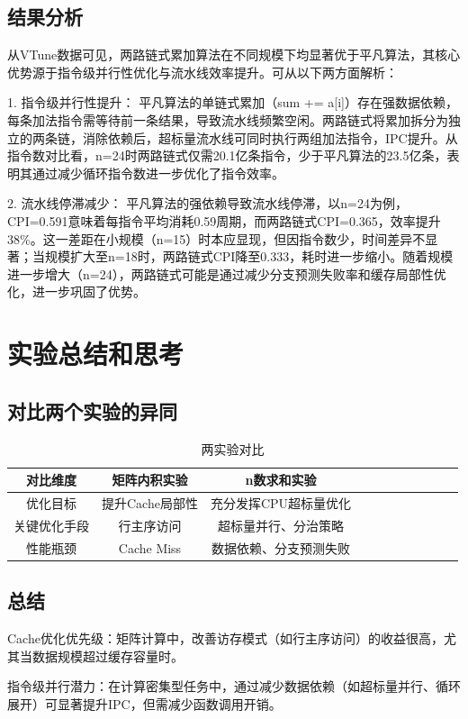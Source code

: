 \documentclass[a4paper]{article}
\begin{document}
\subsection{结果分析}
从VTune数据可见，两路链式累加算法在不同规模下均显著优于平凡算法，其核心优势源于指令级并行性优化与流水线效率提升。可从以下两方面解析：

1. 指令级并行性提升：
平凡算法的单链式累加（sum += a[i]）存在强数据依赖，每条加法指令需等待前一条结果，导致流水线频繁空闲。两路链式将累加拆分为独立的两条链，消除依赖后，超标量流水线可同时执行两组加法指令，IPC提升。从指令数对比看，n=24时两路链式仅需20.1亿条指令，少于平凡算法的23.5亿条，表明其通过减少循环指令数进一步优化了指令效率。

2. 流水线停滞减少：
平凡算法的强依赖导致流水线停滞，以n=24为例，CPI=0.591意味着每指令平均消耗0.59周期，而两路链式CPI=0.365，效率提升38\%。这一差距在小规模（n=15）时本应显现，但因指令数少，时间差异不显著；当规模扩大至n=18时，两路链式CPI降至0.333，耗时进一步缩小。随着规模进一步增大（n=24），两路链式可能是通过减少分支预测失败率和缓存局部性优化，进一步巩固了优势。
\section{实验总结和思考}
\subsection{对比两个实验的异同}
\begin{table}[!htbp]
	\centering
	\begin{tabular}{ccccccccccc}
		\toprule  
		对比维度& 矩阵内积实验& n数求和实验\\
		\midrule
		优化目标&提升Cache局部性&充分发挥CPU超标量优化\\
		关键优化手段&行主序访问&超标量并行、分治策略\\
		性能瓶颈&Cache Miss&数据依赖、分支预测失败\\
		\bottomrule
	\end{tabular}
	\caption{两实验对比}
	\label{table:t7}
\end{table}
\subsection{总结}
Cache优化优先级：矩阵计算中，改善访存模式（如行主序访问）的收益很高，尤其当数据规模超过缓存容量时。

指令级并行潜力：在计算密集型任务中，通过减少数据依赖（如超标量并行、循环展开）可显著提升IPC，但需减少函数调用开销。
\end{document}
